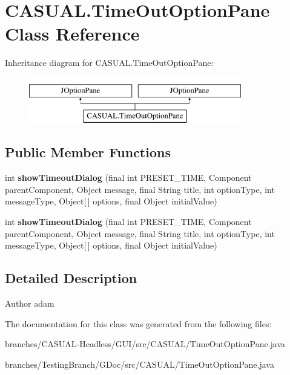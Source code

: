 \hypertarget{classCASUAL_1_1TimeOutOptionPane}{\section{C\-A\-S\-U\-A\-L.\-Time\-Out\-Option\-Pane Class Reference}
\label{classCASUAL_1_1TimeOutOptionPane}
}
Inheritance diagram for C\-A\-S\-U\-A\-L.\-Time\-Out\-Option\-Pane\-:\begin{figure}[H]
\begin{center}
\leavevmode
\includegraphics[height=2.000000cm]{classCASUAL_1_1TimeOutOptionPane}
\end{center}
\end{figure}
\subsection*{Public Member Functions}
\begin{DoxyCompactItemize}
\item 
\hypertarget{classCASUAL_1_1TimeOutOptionPane_aab8afad966d7fbb21ab8478b4b7f61b5}{int {\bfseries show\-Timeout\-Dialog} (final int P\-R\-E\-S\-E\-T\-\_\-\-T\-I\-M\-E, Component parent\-Component, Object message, final String title, int option\-Type, int message\-Type, Object\mbox{[}$\,$\mbox{]} options, final Object initial\-Value)}\label{classCASUAL_1_1TimeOutOptionPane_aab8afad966d7fbb21ab8478b4b7f61b5}

\item 
\hypertarget{classCASUAL_1_1TimeOutOptionPane_aab8afad966d7fbb21ab8478b4b7f61b5}{int {\bfseries show\-Timeout\-Dialog} (final int P\-R\-E\-S\-E\-T\-\_\-\-T\-I\-M\-E, Component parent\-Component, Object message, final String title, int option\-Type, int message\-Type, Object\mbox{[}$\,$\mbox{]} options, final Object initial\-Value)}\label{classCASUAL_1_1TimeOutOptionPane_aab8afad966d7fbb21ab8478b4b7f61b5}

\end{DoxyCompactItemize}


\subsection{Detailed Description}
\begin{DoxyAuthor}{Author}
adam 
\end{DoxyAuthor}


The documentation for this class was generated from the following files\-:\begin{DoxyCompactItemize}
\item 
branches/\-C\-A\-S\-U\-A\-L-\/\-Headless/\-G\-U\-I/src/\-C\-A\-S\-U\-A\-L/Time\-Out\-Option\-Pane.\-java\item 
branches/\-Testing\-Branch/\-G\-Doc/src/\-C\-A\-S\-U\-A\-L/Time\-Out\-Option\-Pane.\-java\end{DoxyCompactItemize}

